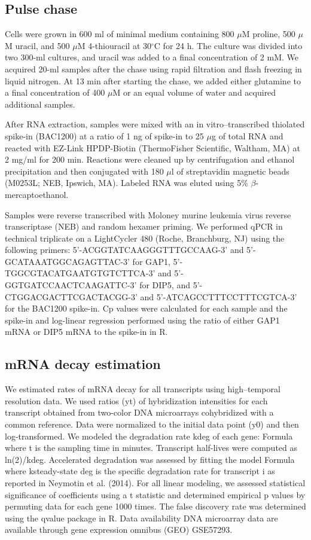 \subsection{Pulse chase} 

Cells were grown in
600 ml of minimal medium containing 800 $\mu$M proline, 500 $\mu$M uracil, and
500 $\mu$M 4-thiouracil at 30$^{\circ}$C for 24 h. The culture was divided into two
300-ml cultures, and uracil was added to a final concentration of 2
mM. We acquired 20-ml samples after the chase using rapid filtration
and flash freezing in liquid nitrogen. At 13 min after starting the
chase, we added either glutamine to a final concentration of 400 $\mu$M or
an equal volume of water and acquired additional samples.  

After RNA
extraction, samples were mixed with an in vitro–transcribed thiolated
spike-in (BAC1200) at a ratio of 1 ng of spike-in to 25 $\mu$g of total
RNA and reacted with EZ-Link HPDP-Biotin (ThermoFisher Scientific,
Waltham, MA) at 2 mg/ml for 200 min. Reactions were cleaned up by
centrifugation and ethanol precipitation and then conjugated with 180
$\mu$l of streptavidin magnetic beads (M0253L; NEB, Ipswich, MA). Labeled
RNA was eluted using 5\% $\beta$-mercaptoethanol.  

Samples were reverse
transcribed with Moloney murine leukemia virus reverse transcriptase
(NEB) and random hexamer priming. We performed qPCR in technical
triplicate on a LightCycler 480 (Roche, Branchburg, NJ) using the
following primers: 5'-ACGGTATCAAGGGTTTGCCAAG-3' and
5'-GCATAAATGGCAGAGTTAC-3' for GAP1, 5'-TGGCGTACATGAATGTGTCTTCA-3' and
5'-GGTGATCCAACTCAAGATTC-3' for DIP5, and 5'-CTGGACGACTTCGACTACGG-3'
and 5'-ATCAGCCTTTCCTTTCGTCA-3' for the BAC1200 spike-in. Cp values
were calculated for each sample and the spike-in and log-linear
regression performed using the ratio of either GAP1 mRNA or DIP5 mRNA
to the spike-in in R.  

\subsection{mRNA decay estimation}

We estimated rates of
mRNA decay for all transcripts using high–temporal resolution data. We
used ratios (yt) of hybridization intensities for each transcript
obtained from two-color DNA microarrays cohybridized with a common
reference. Data were normalized to the initial data point (y0) and
then log-transformed. We modeled the degradation rate kdeg of each
gene: Formula where t is the sampling time in minutes. Transcript
half-lives were computed as ln(2)/kdeg. Accelerated degradation was
assessed by fitting the model Formula where ksteady-state deg is the
specific degradation rate for transcript i as reported in Neymotin et
al. (2014). For all linear modeling, we assessed statistical
significance of coefficients using a t statistic and determined
empirical p values by permuting data for each gene 1000 times. The
false discovery rate was determined using the qvalue package in R.
Data availability DNA microarray data are available through gene
expression omnibus (GEO) GSE57293.

